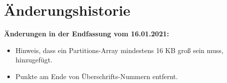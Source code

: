 \section{Änderungshistorie}

\textbf{Änderungen in der Endfassung vom 16.01.2021:}

\begin{itemize}
    \item Hinweis, dass ein Partitions-Array mindestens 16 KB groß sein muss, hinzugefügt.
    \item Punkte am Ende von Überschrifts-Nummern entfernt.
\end{itemize}
